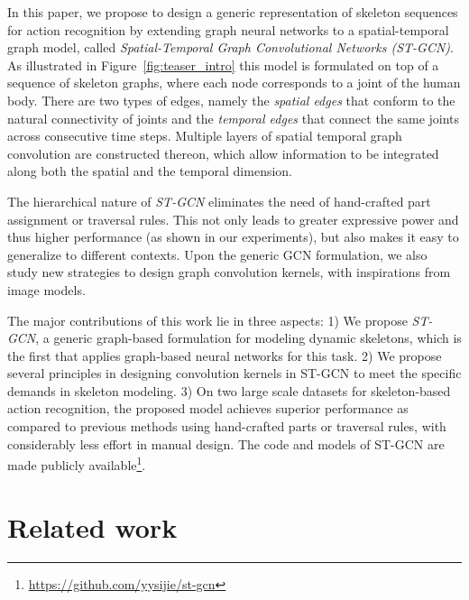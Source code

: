 \documentclass[letterpaper]{article} %
\begin{document}
In this paper, we propose to design a generic representation of skeleton
sequences for action recognition by extending graph neural networks
to a spatial-temporal graph model,
called \emph{Spatial-Temporal Graph Convolutional Networks (ST-GCN)}.
%
As illustrated in Figure~\ref{fig:teaser_intro}
this model is formulated on top of a sequence of skeleton graphs,
where each node corresponds to a joint of the human body. There are
two types of edges, namely the \emph{spatial edges} that conform to the
natural connectivity of joints and the \emph{temporal edges} that
connect the same joints across consecutive time steps.
%
Multiple layers of spatial temporal graph convolution
are constructed thereon, which allow information to be integrated
along both the spatial and the temporal dimension.

The hierarchical nature of \emph{ST-GCN} eliminates the need of hand-crafted
part assignment or traversal rules. This not only leads to greater
expressive power and thus higher performance (as shown in our experiments),
but also makes it easy to generalize to different contexts.
Upon the generic GCN formulation, we also study new strategies to
design graph convolution kernels, with inspirations from image models.

The major contributions of this work lie in three aspects:
1) We propose \emph{ST-GCN}, a generic graph-based formulation
for modeling dynamic skeletons, which is the first that applies graph-based
neural networks for this task.
2) We propose several principles in designing convolution kernels in ST-GCN
to meet the specific demands in skeleton modeling.
3) On two large scale datasets for skeleton-based action
recognition, the proposed model achieves superior performance
as compared to previous methods using hand-crafted parts or traversal rules, with considerably less effort in manual design.
%
The code and models of ST-GCN are made publicly available\footnote{\url{https://github.com/yysijie/st-gcn}}.

\section{Related work}
\end{document}
